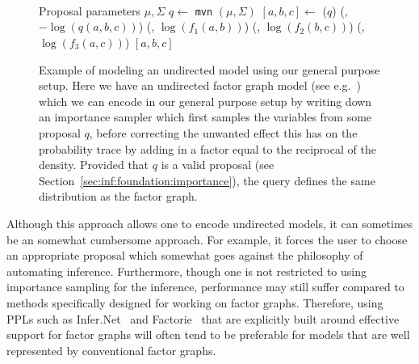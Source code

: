\begin{figure}[t]
	\centering 
						\begin{minipage}[b]{0.49\textwidth}
							\centering	~~
							\resizebox{0.9\textwidth}{!}{
								}		
						\end{minipage}
						~
		\begin{minipage}[b]{0.49\textwidth}
			\centering
			~~~~~
			\begin{algorithmic}[1]
				\renewcommand{\algorithmicrequire}{\textbf{Inputs:}}
				\renewcommand{\algorithmicensure}{\textbf{Outputs:}}			 
				\Require Proposal parameters $\mu,\Sigma$
				\State $q\leftarrow$ \lstinline$mvn$ $(\mu,\Sigma)$
				\State $[a,b,c] \leftarrow$ \sample ($q$)
				\State \observe(\boppfactor, $-\log(q(a,b,c))$)
				\State \observe(\boppfactor, $\log(f_1(a,b))$)
				\State \observe(\boppfactor, $\log(f_2(b,c))$)
				\State \observe(\boppfactor, $\log(f_3(a,c))$)
				\State \Return $[a,b,c]$
			\end{algorithmic}
		\end{minipage}
	\caption{Example of modeling an undirected model using our general purpose setup.  Here
		we have an undirected factor graph model (see e.g.~\cite{bishop2006pattern}) which we
		can encode in our general purpose setup by writing down an importance sampler which
		first samples the variables from some proposal $q$, before correcting the unwanted effect
		this has on the probability trace by adding in a factor equal to the reciprocal of the density.
		Provided that $q$ is a valid proposal (see Section~\ref{sec:inf:foundation:importance}), the
		query defines the same distribution as the factor graph.
		\label{fig:probprog:undir}
		\vspace{5pt}}
\end{figure}

Although this approach allows one to encode undirected models, it can sometimes be an somewhat
cumbersome approach.  For example, it forces the user to choose an appropriate proposal
which somewhat goes against the philosophy of automating inference.  Furthermore, though one is not restricted 
to using importance sampling for the inference, performance
may still suffer compared to methods specifically designed for working on
factor graphs.  Therefore, using PPLs such as Infer.Net~\citep{minka_software_2010} and Factorie~\citep{mccallum_nips_2009}
that are explicitly built around effective support for factor graphs will often tend to be preferable for
models that are well represented by conventional factor graphs.
